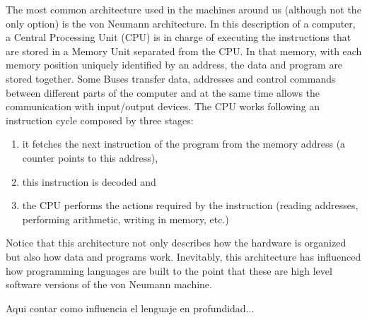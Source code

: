 The most common architecture used in the machines around us (although not the only option) is the von Neumann architecture. 
In this description of a computer, a Central Processing Unit (CPU) is in charge of executing the instructions that are stored in a Memory Unit separated from the CPU. 
In that memory, with each memory position uniquely identified by an address, the data and program are stored together. 
Some Buses transfer data, addresses and control commands between different parts of the computer
and at the same time allows the communication with input/output devices.
The CPU works following an instruction cycle composed by three stages:
\begin{enumerate}[label=(\roman*)]
    \item it fetches the next instruction of the program from the memory address (a counter points to this address),
    \item this instruction is decoded and 
    \item the CPU performs the actions required by the instruction (reading addresses, performing arithmetic, writing in memory, etc.)
\end{enumerate} 

Notice that this architecture not only describes how the hardware is organized but also how data and programs work.
Inevitably, this architecture has influenced how programming languages are built to the point that 
these are high level software versions of the von Neumann machine. 

Aqui contar como influencia el lenguaje en profundidad...






